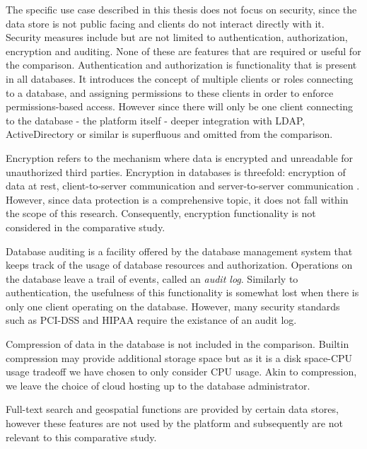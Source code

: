 The specific use case described in this thesis does not focus on security, since the data store is not public facing and clients do not interact directly with it.
Security measures include but are not limited to authentication, authorization, encryption and auditing.
None of these are features that are required or useful for the comparison.
Authentication and authorization is functionality that is present in all databases.
It introduces the concept of multiple clients or roles connecting to a database, and assigning permissions to these clients in order to enforce permissions-based access.
However since there will only be one client connecting to the database - the platform itself - deeper integration with LDAP, ActiveDirectory or similar is superfluous and omitted from the comparison.

Encryption refers to the mechanism where data is encrypted and unreadable for unauthorized third parties.
Encryption in databases is threefold: encryption of data at rest, client-to-server communication and server-to-server communication \autocite{Grolinger2013}.
However, since data protection is a comprehensive topic, it does not fall within the scope of this research.
Consequently, encryption functionality is not considered in the comparative study.

Database auditing is a facility offered by the database management system that keeps track of the usage of database resources and authorization.
Operations on the database leave a trail of events, called an \textit{audit log}.
Similarly to authentication, the usefulness of this functionality is somewhat lost when there is only one client operating on the database.
However, many security standards such as PCI-DSS and HIPAA require the existance of an audit log.

Compression of data in the database is not included in the comparison.
Builtin compression may provide additional storage space but as it is a disk space-CPU usage tradeoff we have chosen to only consider CPU usage.
Akin to compression, we leave the choice of cloud hosting up to the database administrator.

Full-text search and geospatial functions are provided by certain data stores, however these features are not used by the platform and subsequently are not relevant to this comparative study.\\


\begin{landscape}
  
\end{landscape}

